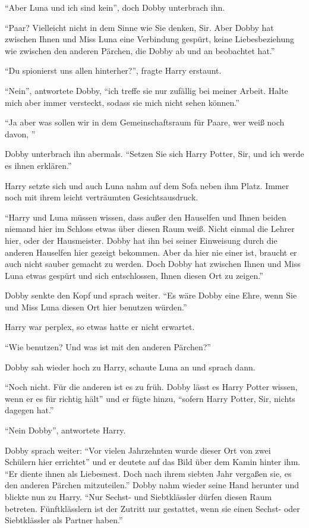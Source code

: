\enquote{Aber Luna und ich sind kein\abs}, doch Dobby unterbrach ihn.

\enquote{Paar? Vielleicht nicht in dem Sinne wie Sie denken, Sir. Aber Dobby hat zwischen Ihnen und Miss Luna eine Verbindung gespürt, keine Liebesbeziehung wie zwischen den anderen Pärchen, die Dobby ab und an beobachtet hat.}

\enquote{Du spionierst uns allen hinterher?}, fragte Harry erstaunt.

\enquote{Nein}, antwortete Dobby, \enquote{ich treffe sie nur zufällig bei meiner Arbeit. Halte mich aber immer versteckt, sodass sie mich nicht sehen können.}

\enquote{Ja aber was sollen wir in dem Gemeinschaftsraum für Paare, wer weiß noch davon, \abs}

Dobby unterbrach ihn abermals. \enquote{Setzen Sie sich Harry Potter, Sir, und ich werde es ihnen erklären.}

Harry setzte sich und auch Luna nahm auf dem Sofa neben ihm Platz. Immer noch mit ihrem leicht verträumten Gesichtsausdruck.

\enquote{Harry und Luna müssen wissen, dass außer den Hauselfen und Ihnen beiden niemand hier im Schloss etwas über diesen Raum weiß. Nicht einmal die Lehrer hier, oder der Hausmeister. Dobby hat ihn bei seiner Einweisung durch die anderen Hauselfen hier gezeigt bekommen. Aber da hier nie einer ist, braucht er auch nicht sauber gemacht zu werden. Doch Dobby hat zwischen Ihnen und Miss Luna etwas gespürt und sich entschlossen, Ihnen diesen Ort zu zeigen.}

Dobby senkte den Kopf und sprach weiter. \enquote{Es wäre Dobby eine Ehre, wenn Sie und Miss Luna diesen Ort hier benutzen würden.}

Harry war perplex, so etwas hatte er nicht erwartet.

\enquote{Wie \gst benutzen? Und was ist mit den anderen Pärchen?}

Dobby sah wieder hoch zu Harry, schaute Luna an und sprach dann.

\enquote{Noch nicht. Für die anderen ist es zu früh. Dobby lässt es Harry Potter wissen, wenn er es für richtig hält} und er fügte hinzu, \enquote{sofern Harry Potter, Sir, nichts dagegen hat.}

\enquote{Nein Dobby}, antwortete Harry.

Dobby sprach weiter: \enquote{Vor vielen Jahrzehnten wurde dieser Ort von zwei Schülern hier errichtet} und er deutete auf das Bild über dem Kamin hinter ihm. \enquote{Er diente ihnen als Liebesnest. Doch nach ihrem siebten Jahr vergaßen sie, es den anderen Pärchen mitzuteilen.} Dobby nahm wieder seine Hand herunter und blickte nun zu Harry. \enquote{Nur Sechst- und Siebtklässler dürfen diesen Raum betreten. Fünftklässlern ist der Zutritt nur gestattet, wenn sie einen Sechst- oder Siebtklässler als Partner haben.}

